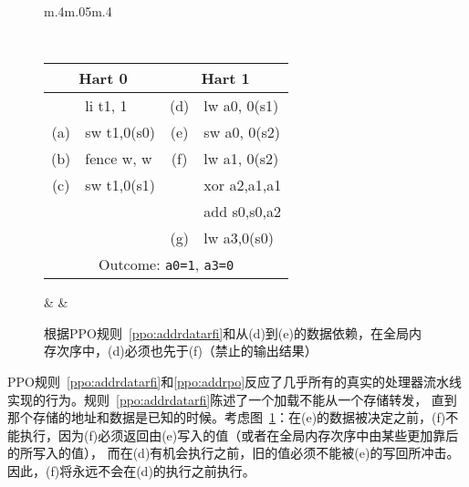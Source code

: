 \begin{figure}[h!]
  \centering
  \begin{tabular}{m{.4\linewidth}m{.05\linewidth}m{.4\linewidth}}
  {
    \tt\small
    \begin{tabular}{cl||cl}
    \multicolumn{2}{c}{Hart 0} & \multicolumn{2}{c}{Hart 1} \\
    \hline
          & li t1, 1    & (d) & lw a0, 0(s1)   \\
      (a) & sw t1,0(s0) & (e) & sw a0, 0(s2)   \\
      (b) & fence w, w  & (f) & lw a1, 0(s2)   \\
      (c) & sw t1,0(s1) &     & xor a2,a1,a1   \\
          &             &     & add s0,s0,a2   \\
          &             & (g) & lw a3,0(s0)    \\   
      \hline
      \multicolumn{4}{c}{Outcome: {\tt a0=1}, {\tt a3=0}}
    \end{tabular}
  } & &
  
  \end{tabular}

  \caption{根据PPO规则~\ref{ppo:addrdatarfi}和从(d)到(e)的数据依赖，在全局内存次序中，(d)必须也先于(f)（禁止的输出结果）
    }
  \label{fig:litmus:addrdatarfi}
\end{figure}

PPO规则~\ref{ppo:addrdatarfi}和\ref{ppo:addrpo}反应了几乎所有的真实的处理器流水线实现的行为。规则~\ref{ppo:addrdatarfi}陈述了一个加载不能从一个存储转发，
直到那个存储的地址和数据是已知的时候。考虑图~\ref{fig:litmus:addrdatarfi}：在(e)的数据被决定之前，(f)不能执行，因为(f)必须返回由(e)写入的值（或者在全局内存次序中由某些更加靠后的所写入的值），
而在(d)有机会执行之前，旧的值必须不能被(e)的写回所冲击。因此，(f)将永远不会在(d)的执行之前执行。

